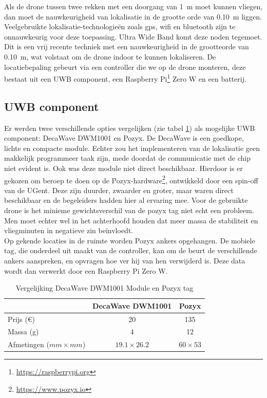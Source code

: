 Als de drone tussen twee rekken met een doorgang van \SI{1}{\m} moet kunnen vliegen, dan moet de nauwkeurigheid van lokalisatie in de grootte orde van \SI{0.10}{\m} liggen. Veelgebruikte lokalisatie-technologie\"en zoals gps, wifi en bluetooth zijn te onnauwkeurig voor deze toepassing. Ultra Wide Band komt deze noden tegemoet. Dit is een vrij recente techniek met een nauwkeurigheid in de grootteorde van \SI{0.10}{\m}, wat volstaat om de drone indoor te kunnen lokaliseren. De locatiebepaling gebeurt via een controller die we op de drone monteren, deze bestaat uit een UWB component, een Raspberry Pi\footnote{\url{https://raspberrypi.org}} Zero W en een batterij.\\ 

\subsection{UWB component} \label{sec:uwb}
Er werden twee verschillende opties vergelijken (zie tabel \ref{tab:decavspozyx}) als mogelijke UWB component: DecaWave DWM1001 en Pozyx. De DecaWave is een goedkope, lichte en compacte module. Echter zou het implementeren van de lokalisatie geen makkelijk programmeer taak zijn, mede doordat de communicatie met de chip niet evident is. Ook was deze module niet direct beschikbaar. Hierdoor is er gekozen om beroep te doen op de Pozyx-hardware\footnote{\url{https://www.pozyx.io}}, ontwikkeld door een spin-off van de UGent. Deze zijn duurder, zwaarder en groter, maar waren direct beschikbaar en de begeleiders hadden hier al ervaring mee. Voor de gebruikte drone is het minieme gewichtsverschil van de pozyx tag niet echt een probleem. Men moet echter wel in het achterhoofd houden dat meer massa de stabiliteit en vliegminuten in negatieve zin be\"invloedt.\\

Op gekende locaties in de ruimte worden Pozyx ankers opgehangen. De mobiele tag, die onderdeel uit maakt van de controller, kan om de beurt de verschillende ankers aanspreken, en opvragen hoe ver hij van hen verwijderd is. Deze data wordt dan verwerkt door een Raspberry Pi Zero W. \\

\begin{table}[p]
	\centering
	\begin{tabular}{ | l | c | c | } \hline
		& DecaWave DWM1001 & Pozyx \\
		\hline 
		\hline
		Prijs (\euro{}) & 20 & 135 \\ 
		\hline
		Massa (g) & 4 & 12 \\ 
		\hline
		Afmetingen ($mm \times mm$) & $19.1 \times 26.2$ & $60 \times 53$ \\ 
		\hline
	\end{tabular}
	\caption[Vergelijking DecaWave DWM1001 Module en Pozyx tag]{Vergelijking DecaWave DWM1001 Module en Pozyx tag}
	\label{tab:decavspozyx}
\end{table}

